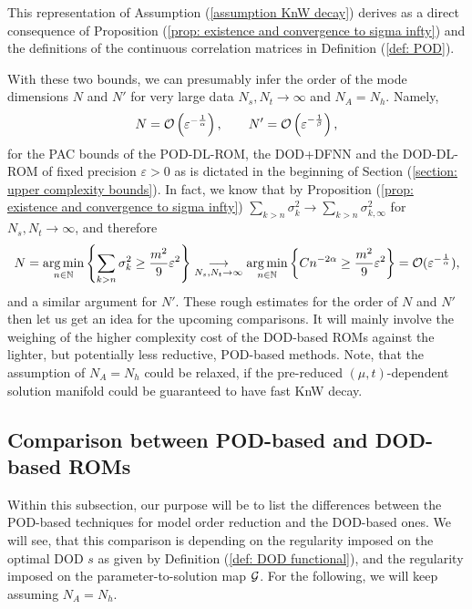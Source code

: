 This representation of Assumption (\ref{assumption KnW decay}) derives as a direct consequence of Proposition 
(\ref{prop: existence and convergence to sigma infty}) and the definitions of the continuous correlation
matrices in Definition (\ref{def: POD}). 

With these two bounds, we can presumably infer the order of the mode dimensions $N$ and $N'$ for very large 
data $N_s, N_t \to \infty$ and $N_A = N_h$. Namely,
\begin{equation} \label{eq: order of N, N'}
    N = \mathcal{O}\left(\varepsilon^{-\frac{1}{\alpha}}\right), \qquad N' = \mathcal{O}\left(\varepsilon^{-\frac{1}{\beta}}\right),
\end{equation}
for the PAC bounds of the POD-DL-ROM, the DOD+DFNN and the DOD-DL-ROM 
of fixed precision $\varepsilon > 0$ as is dictated in the beginning of Section
(\ref{section: upper complexity bounds}). In fact, we know that by
Proposition (\ref{prop: existence and convergence to sigma infty}) $\sum_{k > n} \sigma_k^2 \to \sum_{k > n}
\sigma_{k, \infty}^2$ for $N_s, N_t \to \infty$, and therefore
\begin{equation*}
    N = \underset{n \in \mathbb{N}}{\operatorname{arg \, min}} \left\{\sum_{k > n} \sigma_k^2 \geq
    \frac{m^2}{9} \varepsilon^2
    \right\} \underset{N_s, N_t \to \infty}{\longrightarrow} 
    \underset{n \in \mathbb{N}}{\operatorname{arg \, min}} \left\{ C n^{-2\alpha} \geq
        \frac{m^2}{9} \varepsilon^2 
    \right\} = \mathcal{O}(\varepsilon^{-\frac{1}{\alpha}}),
\end{equation*}
and a similar argument for $N'$. These rough estimates for the order of $N$ and $N'$ then let us 
get an idea for the upcoming comparisons. It will mainly involve the weighing of the higher complexity
cost of the DOD-based ROMs against the lighter, but potentially less reductive, POD-based methods.
Note, that the assumption of $N_A = N_h$ could be relaxed, if the pre-reduced $(\mu, t)$-dependent solution
manifold could be guaranteed to have fast KnW decay.




\subsection{Comparison between POD-based and DOD-based ROMs}




Within this subsection, our purpose will be to list the differences between the POD-based techniques for 
model order reduction and the DOD-based ones. We will see, that this comparison is depending on the regularity imposed on 
the optimal DOD $s$ as given by Definition (\ref{def: DOD functional}), 
and the regularity imposed on the parameter-to-solution map $\mathcal{G}$. For the following, we will keep
assuming $N_A = N_h$.

